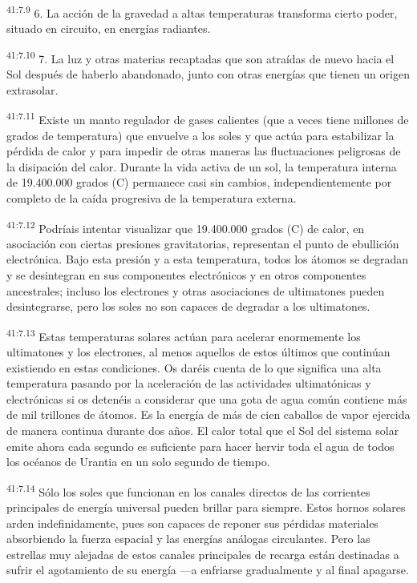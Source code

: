 \par
\textsuperscript{41:7.9} 6. La acción de la gravedad a altas temperaturas transforma cierto poder, situado en circuito, en energías radiantes.

\par
\textsuperscript{41:7.10} 7. La luz y otras materias recaptadas que son atraídas de nuevo hacia el Sol después de haberlo abandonado, junto con otras energías que tienen un origen extrasolar.

\par
\textsuperscript{41:7.11} Existe un manto regulador de gases calientes (que a veces tiene millones de grados de temperatura) que envuelve a los soles y que actúa para estabilizar la pérdida de calor y para impedir de otras maneras las fluctuaciones peligrosas de la disipación del calor. Durante la vida activa de un sol, la temperatura interna de 19.400.000 grados (C) permanece casi sin cambios, independientemente por completo de la caída progresiva de la temperatura externa.

\par
\textsuperscript{41:7.12} Podríais intentar visualizar que 19.400.000 grados (C) de calor, en asociación con ciertas presiones gravitatorias, representan el punto de ebullición electrónica. Bajo esta presión y a esta temperatura, todos los átomos se degradan y se desintegran en sus componentes electrónicos y en otros componentes ancestrales; incluso los electrones y otras asociaciones de ultimatones pueden desintegrarse, pero los soles no son capaces de degradar a los ultimatones.

\par
\textsuperscript{41:7.13} Estas temperaturas solares actúan para acelerar enormemente los ultimatones y los electrones, al menos aquellos de estos últimos que continúan existiendo en estas condiciones. Os daréis cuenta de lo que significa una alta temperatura pasando por la aceleración de las actividades ultimatónicas y electrónicas si os detenéis a considerar que una gota de agua común contiene más de mil trillones de átomos. Es la energía de más de cien caballos de vapor ejercida de manera continua durante dos años. El calor total que el Sol del sistema solar emite ahora cada segundo es suficiente para hacer hervir toda el agua de todos los océanos de Urantia en un solo segundo de tiempo.

\par
\textsuperscript{41:7.14} Sólo los soles que funcionan en los canales directos de las corrientes principales de energía universal pueden brillar para siempre. Estos hornos solares arden indefinidamente, pues son capaces de reponer sus pérdidas materiales absorbiendo la fuerza espacial y las energías análogas circulantes. Pero las estrellas muy alejadas de estos canales principales de recarga están destinadas a sufrir el agotamiento de su energía ---a enfriarse gradualmente y al final apagarse.

